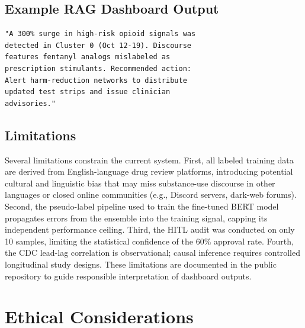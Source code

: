 \documentclass[10pt,twocolumn]{article}
\begin{document}
\subsection*{Example RAG Dashboard Output}

\begin{lstlisting}
"A 300% surge in high-risk opioid signals was
detected in Cluster 0 (Oct 12-19). Discourse
features fentanyl analogs mislabeled as
prescription stimulants. Recommended action:
Alert harm-reduction networks to distribute
updated test strips and issue clinician
advisories."
\end{lstlisting}

\subsection*{Limitations}

Several limitations constrain the current system. First, all labeled training data are derived from English-language drug review platforms, introducing potential cultural and linguistic bias that may miss substance-use discourse in other languages or closed online communities (e.g., Discord servers, dark-web forums). Second, the pseudo-label pipeline used to train the fine-tuned BERT model propagates errors from the ensemble into the training signal, capping its independent performance ceiling. Third, the HITL audit was conducted on only 10 samples, limiting the statistical confidence of the 60\% approval rate. Fourth, the CDC lead-lag correlation is observational; causal inference requires controlled longitudinal study designs. These limitations are documented in the public repository to guide responsible interpretation of dashboard outputs.

\section{Ethical Considerations}
\end{document}
